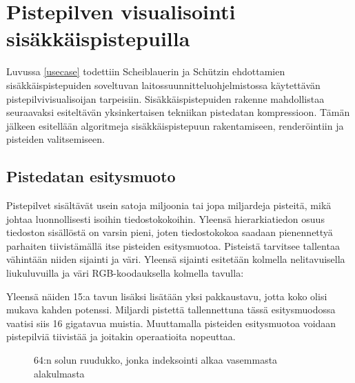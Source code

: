 \section{Pistepilven visualisointi sisäkkäispistepuilla}\label{mun}

Luvussa \ref{usecase} todettiin Scheiblauerin ja Schützin ehdottamien sisäkkäispistepuiden soveltuvan laitossuunnitteluohjelmistossa käytettävän pistepilvivisualisoijan tarpeisiin. Sisäkkäispistepuiden rakenne mahdollistaa seuraavaksi esiteltävän yksinkertaisen tekniikan pistedatan kompressioon. Tämän jälkeen esitellään algoritmeja sisäkkäispistepuun rakentamiseen, renderöintiin ja pisteiden valitsemiseen.

\subsection{Pistedatan esitysmuoto}\label{kompressio}

Pistepilvet sisältävät usein satoja miljoonia tai jopa miljardeja pisteitä, mikä johtaa luonnollisesti isoihin tiedostokokoihin. Yleensä hierarkiatiedon osuus tiedoston sisällöstä on varsin pieni, joten tiedostokokoa saadaan pienennettyä parhaiten tiivistämällä itse pisteiden esitysmuotoa. Pisteistä tarvitsee tallentaa vähintään niiden sijainti ja väri. Yleensä sijainti esitetään kolmella nelitavuisella liukuluvuilla ja väri RGB-koodauksella kolmella tavulla:


\noindent Yleensä näiden 15:a tavun lisäksi lisätään yksi pakkaustavu, jotta koko olisi mukava kahden potenssi. Miljardi pistettä tallennettuna tässä esitysmuodossa vaatisi siis 16 gigatavua muistia. Muuttamalla pisteiden esitysmuotoa voidaan pistepilviä tiivistää ja joitakin operaatioita nopeuttaa.

\begin{figure}
    
    \caption{64:n solun ruudukko, jonka indeksointi alkaa vasemmasta alakulmasta}
    \label{ruudukkokuva}
\end{figure}

